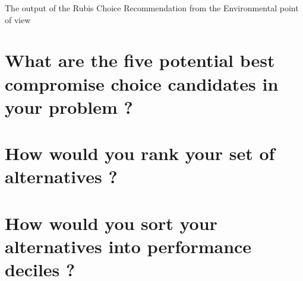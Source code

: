 \documentclass[a4paper]{article}
\begin{document}
The output of the Rubis Choice Recommendation from the Environmental point of view 

\section{What are the five potential best compromise choice candidates in your problem ?}

\section{How would you rank your set of alternatives ?}

\section{How would you sort your alternatives into performance deciles ? }


	\printbibliography
\end{document}
